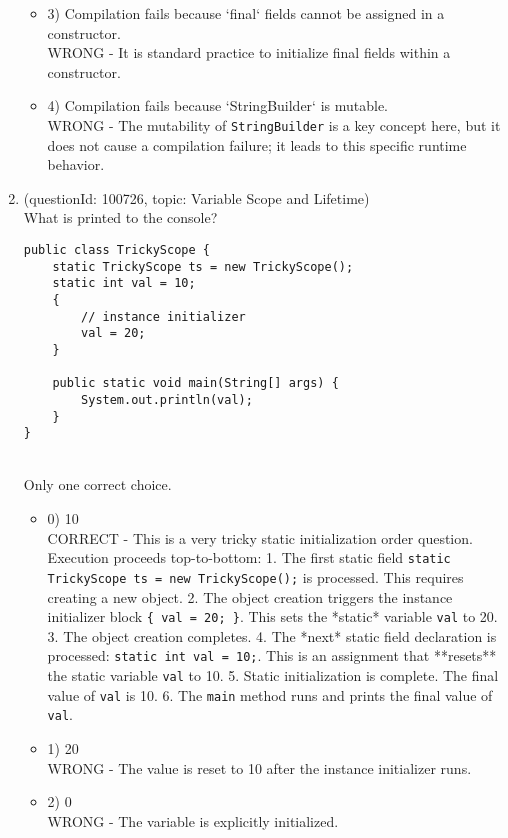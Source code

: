 \documentclass[12pt]{article}
\begin{document}
\begin{enumerate}[label=(\arabic*)]
\begin{itemize}
\item 3) Compilation fails because `final` fields cannot be assigned in a constructor.
 \\ 
WRONG - It is standard practice to initialize final fields within a constructor.

\item 4) Compilation fails because `StringBuilder` is mutable.
 \\ 
WRONG - The mutability of \verb|StringBuilder| is a key concept here, but it does not cause a compilation failure; it leads to this specific runtime behavior.

\end{itemize}
\item (questionId: 100726, topic: Variable Scope and Lifetime) \\ 
What is printed to the console?\n\begin{verbatim}
public class TrickyScope {
    static TrickyScope ts = new TrickyScope();
    static int val = 10;
    {
        // instance initializer
        val = 20;
    }

    public static void main(String[] args) {
        System.out.println(val);
    }
}
\end{verbatim}
\\ \noindent Only one correct choice. 
\begin{itemize}
\item 0) 10
 \\ 
CORRECT - This is a very tricky static initialization order question. Execution proceeds top-to-bottom:
1. The first static field \verb|static TrickyScope ts = new TrickyScope();| is processed. This requires creating a new object.
2. The object creation triggers the instance initializer block \verb|{ val = 20; }|. This sets the *static* variable \verb|val| to 20.
3. The object creation completes.
4. The *next* static field declaration is processed: \verb|static int val = 10;|. This is an assignment that **resets** the static variable \verb|val| to 10.
5. Static initialization is complete. The final value of \verb|val| is 10.
6. The \verb|main| method runs and prints the final value of \verb|val|.

\item 1) 20
 \\ 
WRONG - The value is reset to 10 after the instance initializer runs.

\item 2) 0
 \\ 
WRONG - The variable is explicitly initialized.


\end{itemize}
\end{enumerate}
\end{document}
